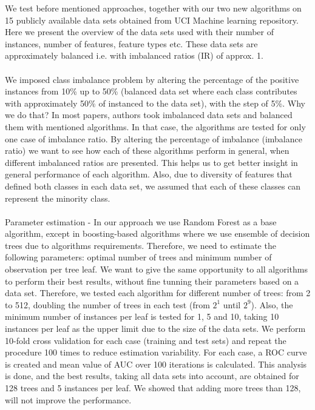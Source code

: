 \documentclass[a4paper]{article}
\begin{document}
\begin{enumerate}[I]
We test before mentioned approaches, together with our two new algorithms on 15 publicly available data sets obtained from UCI Machine learning repository.
Here we present the overview of the data sets used with their number of instances, number of features, feature types etc. These data sets are approximately balanced i.e. with imbalanced ratios (IR) of approx. 1.
\\\\
We imposed class imbalance problem by altering the percentage of the positive instances from 10\% up to 50\% (balanced data set where each class contributes with approximately 50\% of instanced to the data set), with the step of 5\%. Why we do that? In most  papers, authors took imbalanced data sets and balanced them with mentioned algorithms. In that case, the algorithms are tested for only one case of imbalance ratio. By altering the percentage of imbalance (imbalance ratio) we want to see how each of these algorithms perform in general, when different imbalanced ratios are presented. This helps us to get better insight in general performance of each algorithm. Also, due to diversity of features that defined both classes in each data set, we assumed that each of these classes can represent the minority class.
\\\\
Parameter estimation - In our approach we use Random Forest as a base algorithm, except in boosting-based algorithms where we use ensemble of decision trees due to algorithms requirements. Therefore, we need to estimate the following parameters: optimal number of trees and minimum number of observation per tree leaf. We want to give the same opportunity to all algorithms to perform their best results, without fine tunning their parameters based on a data set. Therefore, we tested each algorithm for different number of trees: from 2  to 512, doubling the number of trees in each test (from $2^{1}$ until $2^{9}$). Also, the minimum number of instances per leaf is tested for 1, 5 and 10, taking 10 instances per leaf as the upper limit due to the size of the data sets. We perform 10-fold cross validation for each case (training and test sets) and repeat the procedure 100 times to reduce estimation variability. For each case, a ROC curve is created and mean value of AUC over 100 iterations is calculated. \color{red} This analysis is done, and the best results, taking all data sets into account, are obtained for 128 trees and 5 instances per leaf. We showed that adding more trees than 128, will not improve the performance.
\\\\

\end{enumerate}
\end{document}
